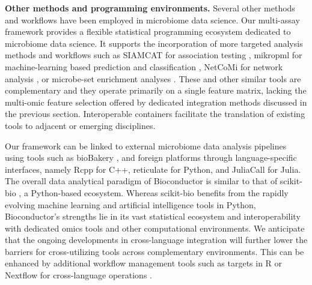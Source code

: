 \documentclass[
  sn-nature,
]{sn-jnl}
\begin{document}
\textbf{Other methods and programming environments.} Several other
methods and workflows have been employed in microbiome data science. Our
multi-assay framework provides a flexible statistical programming
ecosystem dedicated to microbiome data science. It supports the
incorporation of more targeted analysis methods and workflows such as
SIAMCAT for association testing \citep{wirbel2021}, mikropml for
machine-learning based prediction and classification
\citep{topcuoglu2021}, NetCoMi for network analysis \citep{peschel2021},
or microbe-set enrichment analyses \citep{kou2020, pham2025}. These and
other similar tools are complementary and they operate primarily on a
single feature matrix, lacking the multi-omic feature selection offered
by dedicated integration methods discussed in the previous section.
Interoperable containers facilitate the translation of existing tools to
adjacent or emerging disciplines.

Our framework can be linked to external microbiome data analysis
pipelines using tools such as bioBakery \citep{beghini2021}, and foreign
platforms through language-specific interfaces, namely Rcpp for C++,
reticulate for Python, and JuliaCall for Julia. The overall data
analytical paradigm of Bioconductor is similar to that of scikit-bio
\citep{aton2026}, a Python-based ecosystem. Whereas scikit-bio benefits
from the rapidly evolving machine learning and artificial intelligence
tools in Python, Bioconductor's strengths lie in its vast statistical
ecosystem and interoperability with dedicated omics tools and other
computational environments. We anticipate that the ongoing developments
in cross-language integration will further lower the barriers for
cross-utilizing tools across complementary environments. This can be
enhanced by additional workflow management tools such as targets in R
\citep{landau2021} or Nextflow for cross-language operations
\citep{di2017}.
\end{document}
